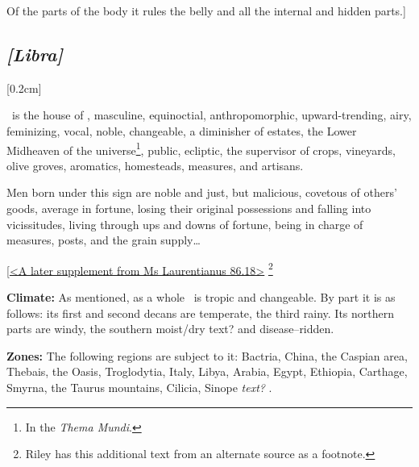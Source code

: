 Of the parts of the body it rules the belly and all the internal and hidden parts.]
\secbr
\subsection{\textit{[Libra]}}
[0.2cm]

 \Libra\, is the house of \Venus,  masculine,  equinoctial,  anthropomorphic, upward-trending,  airy, feminizing,  vocal, noble, changeable, a diminisher of estates, the Lower Midheaven of the universe\footnote{In the \textit{Thema Mundi}.}, public, ecliptic, the supervisor of crops, vineyards, olive groves, aromatics, homesteads, measures, and artisans.

Men born under this sign are noble and just, but malicious, covetous of others’ goods, average in fortune, losing their original possessions and falling into vicissitudes, living through ups and downs of fortune, being in charge of measures, posts, and the grain supply\ldots

\noindent
[\underline{<A later supplement from Ms Laurentianus 86.18>}
\footnote{Riley has this additional text from an alternate source as a footnote.}  

\textbf{Climate:} As mentioned, as a whole \Libra\, is tropic and changeable. By part it is as follows: its first and second decans are temperate, the third rainy. Its northern parts are windy, the southern moist/dry text? and disease–ridden. 

\textbf{Zones:} The following regions are subject to it:
Bactria, China, the Caspian area, Thebais, the Oasis, Troglodytia, Italy, Libya, Arabia, Egypt, Ethiopia, Carthage, Smyrna, the Taurus mountains, Cilicia, Sinope \textit{text?} . 

